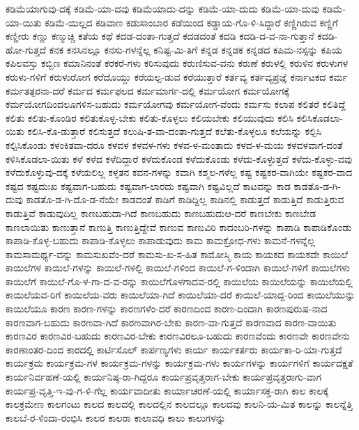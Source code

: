 {ಕಡಿಮೆಯಾಗುವು-ದಕ್ಕೆ
ಕಡಿಮೆ-ಯಾ-ದವು
ಕಡಿಮೆಯಾದು-ದನ್ನು
ಕಡಿಮೆ-ಯಾ-ದುದು
ಕಡಿಮೆ-ಯಾ-ದುವು
ಕಡಿಮೆ-ಯಾ-ಯಿತು
ಕಡಿಮೆ-ಯಿಲ್ಲದ
ಕಡಿವಾಣ
ಕಡುಸಾಂಬಾರ
ಕಡೆಯಿಂದ
ಕಡ್ಡಾಯ-ಗೊ-ಳಿ-ಸಿದ್ದಾರೆ
ಕಣ್ಣಿಗಿರುವ
ಕಣ್ಣಿಗೆ
ಕಣ್ಣೀರು
ಕಣ್ಣು
ಕಣ್ಮುಚ್ಚಿ
ಕತೆಯ
ಕಥೆ
ಕದಡ-ದಂತಾ-ಗುತ್ತದೆ
ಕದಡದಂತೆ
ಕದಡಿ
ಕದಡಿ-ದ-ವ-ನಾ-ಗುತ್ತಾನೆ
ಕದಡಿ-ಹೋ-ಗುತ್ತದೆ
ಕನಕ
ಕನಸಿನಲ್ಲೂ
ಕನಸು-ಗಳನ್ನೆಲ್ಲ
ಕನಿಷ್ಟ-ಮಿ-ತಿಗೆ
ಕನ್ನಡ
ಕನ್ನಡಕ
ಕನ್ನಡದ
ಕಪಿಮ-ನಸ್ಸನ್ನು
ಕಪಿಯ
ಕಪಿಲವಸ್ತು
ಕಬ್ಬಿಣ
ಕಮಾನಿನಂತೆ
ಕರಕರೆ-ಗಳು
ಕರಿಸುವುದು
ಕರುಣಿಸುವ-ವನು
ಕರುಣೆ
ಕರುಳಲ್ಲಿ
ಕರುಳಿನ
ಕರುಳುಗಳ
ಕರುಳು-ಗಳಿಗೆ
ಕರುಳುರೋಗ
ಕರೆದೊಯ್ದು
ಕರೆಯಲ್ಪ-ಡುವ
ಕರೆಯುತ್ತಾರೆ
ಕರ್ತವ್ಯ
ಕರ್ತವ್ಯಪ್ರಜ್ಞೆ
ಕರ್ನಾಟಕದ
ಕರ್ಮ
ಕರ್ಮತತ್ಪರನಾ-ದರೆ
ಕರ್ಮದ
ಕರ್ಮಫಲದ
ಕರ್ಮಮಾರ್ಗ-ದಲ್ಲಿ
ಕರ್ಮಯೋಗ
ಕರ್ಮಯೋಗಕ್ಕೆ
ಕರ್ಮಯೋಗದಿಂದಲೂಗಳಿಸ-ಬಹುದು
ಕರ್ಮಯೋಗವು
ಕರ್ಮಯೋಗ-ವೆಂದು
ಕರ್ಮಸು
ಕಲಾಪ
ಕಲಿತರೆ
ಕಲಿತಿದ್ದೆ
ಕಲಿತು
ಕಲಿತು-ಕೊಂಡಿರ
ಕಲಿತುಕೊಳ್ಳ-ಬೇಕು
ಕಲಿತು-ಕೊಳ್ಳಲು
ಕಲಿಯಬೇಕು
ಕಲಿಯುವುದು
ಕಲಿಸಿ
ಕಲಿಸಿಕೊಡಲಾ-ಯಿತು
ಕಲಿಸಿ-ಕೊ-ಡುತ್ತಾರೆ
ಕಲಿಸುತ್ತದೆ
ಕಲುಷಿ-ತ-ವಾ-ದಂತಾ-ಗುತ್ತದೆ
ಕಲೆತು-ಕೊಳ್ಳಲೂ
ಕಲೆಯನ್ನು
ಕಲ್ಪಿಸಿ
ಕಲ್ಪಿಸಿಕೊಂಡು
ಕಳಂಕಿತವಾ-ದರೂ
ಕಳವಳ
ಕಳವಳ-ಗಳು
ಕಳವ-ಳ-ಮಂತಾದು
ಕಳವ-ಳ-ಮಯ
ಕಳವಳವಾಗ-ದಂತೆ
ಕಳಿಸಿಕೊಡಲಾ-ಯಿತು
ಕಳೆ
ಕಳೆದ
ಕಳೆದಿದ್ದಾರೆ
ಕಳೆದುಕೊಂಡ
ಕಳೆದುಕೊಂಡು
ಕಳೆದು-ಕೊಳ್ಳುತ್ತದೆ
ಕಳೆದು-ಕೊಳ್ಳು-ವವು
ಕಳೆದುಕೊಳ್ಳುವು-ದಕ್ಕೆ
ಕಳೆಯಲಿಲ್ಲ
ಕಳ್ಳತನ
ಕವನ-ಗಳನ್ನು
ಕವಾಗಿ
ಕಶ್ಮಲ-ಗಳೆಲ್ಲ
ಕಷ್ಟ
ಕಷ್ಟಕರ-ವಾಗಿಯೇ
ಕಷ್ಟಕರ-ವಾದ
ಕಷ್ಟದ
ಕಷ್ಟದುಃಖ
ಕಷ್ಟವಾಗ-ಬಹುದು
ಕಷ್ಟವಾಗ-ಲಾರದು
ಕಷ್ಟವಾಗಿ
ಕಷ್ಟವಿಲ್ಲದೆ
ಕಾಟವನ್ನು
ಕಾಡ
ಕಾಡತೊ-ಡ-ಗಿ-ದುವು
ಕಾಡತೊ-ಡ-ಗಿ-ದೊ-ಡ-ನೆಯೇ
ಕಾಡದಂತೆ
ಕಾಡಿಗೆ
ಕಾಡಿದ್ದಿಲ್ಲ
ಕಾಡಿನಲ್ಲಿ
ಕಾಡುತ್ತದೆ
ಕಾಡುತ್ತಿದೆ
ಕಾಡುತ್ತಿರುವ
ಕಾಡುತ್ತಿವೆ
ಕಾಡುವುದಿಲ್ಲ
ಕಾಣಬಹುದಾ-ಗಿದೆ
ಕಾಣಬಹುದು
ಕಾಣಬಹುದುಆ-ದರೆ
ಕಾಣಬೇಕು
ಕಾಣಬೇಡ
ಕಾಣಲಾಯಿತು
ಕಾಣುತ್ತಾನೆ
ಕಾಣುತ್ತಿ
ಕಾಣುತ್ತಿದ್ದೇವೆ
ಕಾಣುವ
ಕಾಣುವಿರಿ
ಕಾದಂಬರಿ-ಗಳನ್ನು
ಕಾಪಾಡಿ
ಕಾಪಾಡಿಕೊಂಡು
ಕಾಪಾಡಿ-ಕೊಳ್ಳ-ಬಹುದು
ಕಾಪಾಡಿ-ಕೊಳ್ಳಲು
ಕಾಪಾಡುವುದು
ಕಾಮ
ಕಾಮಕ್ರೋಧ-ಗಳು
ಕಾಮನೆ-ಗಳನ್ನೆಲ್ಲ
ಕಾಮಸಾಮರ್ಥ್ಯ-ವನ್ನು
ಕಾಮಸುಖವೆಂ-ದರೆ
ಕಾಮಸು-ಖ-ಸ-ಹಿತ
ಕಾಮೋಸ್ಮಿ
ಕಾಯ
ಕಾಯಕದ
ಕಾಯಕವೇ
ಕಾಯಿಲೆ
ಕಾಯಿಲೆಗಳ
ಕಾಯಿಲೆ-ಗಳನ್ನು
ಕಾಯಿಲೆ-ಗಳಲ್ಲಿ
ಕಾಯಿಲೆ-ಗಳಿಂದ
ಕಾಯಿಲೆ-ಗ-ಳಿಂದಾಗಿ
ಕಾಯಿಲೆ-ಗಳಿಗೆ
ಕಾಯಿಲೆಗಳು
ಕಾಯಿಲೆಗೆ
ಕಾಯಿಲೆ-ಗೊ-ಳ-ಗಾ-ದ-ವ-ರನ್ನು
ಕಾಯಿಲೆಗೊಳಗಾದವ-ರಲ್ಲಿ
ಕಾಯಿಲೆಯ
ಕಾಯಿಲೆಯನ್ನು
ಕಾಯಿಲೆಯಲ್ಲಿ
ಕಾಯಿಲೆಯವ-ರಿಗೆ
ಕಾಯಿಲೆಯ-ವರು
ಕಾಯಿಲೆಯಾ-ಗಿದೆ
ಕಾಯಿಲೆಯಾ-ದರೆ
ಕಾಯಿಲೆ-ಯಾದ್ದ-ರಿಂದ
ಕಾಯಿಲೆಯುನ್ನು
ಕಾಯಿಲೆಯೂ
ಕಾರಣ
ಕಾರಣ-ಗಳನ್ನು
ಕಾರಣಗಳೆಂ-ದರೆ
ಕಾರಣದಿಂದ
ಕಾರಣ-ದಿಂದಾಗಿ
ಕಾರಣಪುರುಷ-ನಾದ
ಕಾರಣವಾಗ-ಬಹುದು
ಕಾರಣವಾ-ಗಿದೆ
ಕಾರಣವಾಗಿರ-ಬೇಕು
ಕಾರಣ-ವಾ-ಗುತ್ತದೆ
ಕಾರಣವಾದ
ಕಾರಣ-ವಾಯಿತು
ಕಾರಣವಿರ
ಕಾರಣವಿರ-ಬಹುದು
ಕಾರಣವಿರ-ಬೇಕು
ಕಾರಣವಿರಲೂ-ಬಹುದು
ಕಾರಣವೆಂದು
ಕಾರಣವೇ
ಕಾರಣವೇನು
ಕಾರಣಾಂತರ-ದಿಂದ
ಕಾರದಲ್ಲಿ
ಕಾರ್ಟಿಸೊಲ್
ಕಾರ್ಪಣ್ಯಗಳು
ಕಾರ್ಯ
ಕಾರ್ಯಕರ್ತರು
ಕಾರ್ಯಕಾ-ರಿ-ಯಾ-ಗುತ್ತದೆ
ಕಾರ್ಯಕ್ರಮ
ಕಾರ್ಯಕ್ರಮ-ಗಳ
ಕಾರ್ಯಕ್ರಮ-ಗಳನ್ನು
ಕಾರ್ಯಕ್ರಮ-ಗಳು
ಕಾರ್ಯಗಳನ್ನು
ಕಾರ್ಯಗಳಿಗೆ
ಕಾರ್ಯದಕ್ಷತೆ
ಕಾರ್ಯನಿರ್ವಹಣೆ-ಯಲ್ಲಿ
ಕಾರ್ಯನಿಷ್ಠ-ರಾ-ಗಿದ್ದರೂ
ಕಾರ್ಯಪ್ರವೃತ್ತರಾಗ-ಬೇಕು
ಕಾರ್ಯಪ್ರವೃತ್ತರಾಗು-ವಾಗ
ಕಾರ್ಯಪ್ರ-ವೃತ್ತಿ-ಇ-ವು-ಗ-ಳಿ-ಗೆಲ್ಲ
ಕಾರ್ಯವಾದೀತು
ಕಾರ್ಯಾಚರಣೆ-ಯಲ್ಲಿ
ಕಾರ್ಯಾಸಕ್ತ-ರಾಗಿ
ಕಾಲ
ಕಾಲಕ್ಕೆ
ಕಾಲಕ್ರಮೇಣ
ಕಾಲಗಂಟು
ಕಾಲದ
ಕಾಲದಲ್ಲಿ
ಕಾಲದಲ್ಲಿನ
ಕಾಲದಲ್ಲೂ
ಕಾಲದವು
ಕಾಲನಿ-ಯ-ಮಿತ
ಕಾಲನ್ನು
ಕಾಲನ್ನೆತ್ತಿ
ಕಾಲಬೆ-ರ-ಳಿಂದಾ-ರಂಭಿಸಿ
ಕಾಲರ
ಕಾಲರಾ
ಕಾಲಾವಧಿ
ಕಾಲು
ಕಾಲುಗಳನ್ನು
}

